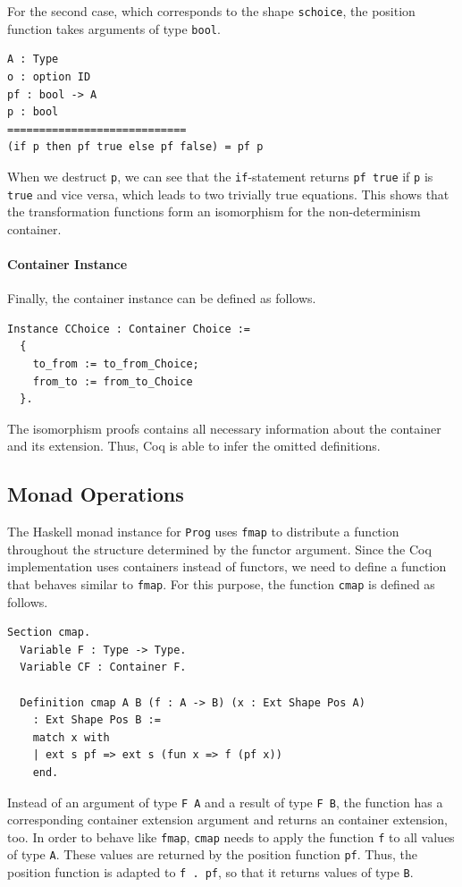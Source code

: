 \documentclass[a4paper, 11pt, fleqn, twoside, abstract=on]{scrreprt}
\newcommand{\hinl}[1]{\texttt{#1}}
\newcommand{\cinl}[1]{\texttt{#1}}
\begin{document}
For the second case, which corresponds to the shape \cinl{schoice}, the position function takes arguments of type \cinl{bool}.

\begin{verbatim}
A : Type
o : option ID
pf : bool -> A
p : bool
============================
(if p then pf true else pf false) = pf p
\end{verbatim}
\noindent
When we destruct \hinl{p}, we can see that the \cinl{if}-statement returns \cinl{pf true} if \cinl{p} is \cinl{true} and vice versa, which leads to two trivially true equations.
This shows that the transformation functions form an isomorphism for the non-determinism container.
\pagebreak
\paragraph{Container Instance}
Finally, the container instance can be defined as follows.

\begin{verbatim}
Instance CChoice : Container Choice :=
  {
    to_from := to_from_Choice;
    from_to := from_to_Choice
  }.
\end{verbatim}
\noindent
The isomorphism proofs contains all necessary information about the container and its extension.
Thus, Coq is able to infer the omitted definitions.

\subsection{Monad Operations}
The Haskell monad instance for \hinl{Prog} uses \hinl{fmap} to distribute a function throughout the structure determined by the functor argument.
Since the Coq implementation uses containers instead of functors, we need to define a function that behaves similar to \hinl{fmap}.
For this purpose, the function \cinl{cmap} is defined as follows.

\begin{verbatim}
Section cmap.
  Variable F : Type -> Type.
  Variable CF : Container F.

  Definition cmap A B (f : A -> B) (x : Ext Shape Pos A) 
    : Ext Shape Pos B :=
    match x with
    | ext s pf => ext s (fun x => f (pf x))
    end.
\end{verbatim}
\noindent
Instead of an argument of type \cinl{F A} and a result of type \cinl{F B}, the function has a corresponding container extension argument and returns an container extension, too.
In order to behave like \hinl{fmap}, \cinl{cmap} needs to apply the function \cinl{f} to all values of type \cinl{A}.
These values are returned by the position function \cinl{pf}.
Thus, the position function is adapted to \cinl{f . pf}, so that it returns values of type \cinl{B}.
\end{document}
